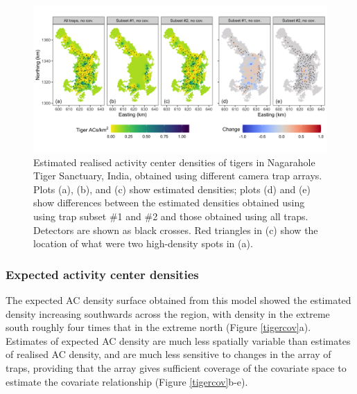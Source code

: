 \documentclass[10pt,a4paper]{article}
\begin{document}
\begin{figure}[htbp]
\centering
\includegraphics[width=1\textwidth]{tiger_surfaces_nocovs.png}
\caption{Estimated realised activity center densities of tigers in Nagarahole Tiger Sanctuary, India, obtained using different camera trap arrays. Plots (a), (b), and (c) show estimated densities; plots (d) and (e) show differences between the estimated densities obtained using using trap subset \#1 and \#2 and those obtained using all traps. Detectors are shown as black crosses. Red triangles in (c) show the location of what were two high-density spots in (a).}
\label{tigernocov}
\end{figure}

\subsubsection{Expected activity center densities}

The expected AC density surface obtained from this model showed the estimated density increasing southwards across the region, with density in the extreme south roughly four times that in the extreme north (Figure \ref{tigercov}a). Estimates of expected AC density are much less spatially variable than estimates of realised AC density, and are much less sensitive to changes in the array of traps, providing that the array gives sufficient coverage of the covariate space to estimate the covariate relationship (Figure \ref{tigercov}b-e). 
\end{document}
